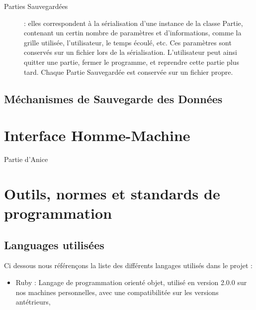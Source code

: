 \documentclass[11pt]{article}
\begin{document}
\begin{description}
    \item [Parties Sauvegardées] : elles correspondent à la sérialisation d'une instance de la classe Partie, contenant un certin nombre de paramètres et d'informations, comme la grille utilisée, l'utilisateur, le temps écoulé, etc. Ces paramètres sont conservés sur un fichier lors de la sérialisation. L'utilisateur peut ainsi quitter une partie, fermer le programme, et reprendre cette partie plus tard. Chaque Partie Sauvegardée est conservée sur un fichier propre.
\end{description}

\subsection{Méchanismes de Sauvegarde des Données}



\newpage %

\section{Interface Homme-Machine}

Partie d'Anice

\newpage

\section{Outils, normes et standards de programmation}

\subsection{Languages utilisées}

Ci dessous nous référençons la liste des différents langages utilisés dans le projet : 

\begin{itemize}
	\item Ruby : Langage de programmation orienté objet, utilisé en version 2.0.0 sur nos machines personnelles, avec une compatibilitée sur les versions antétrieurs,
\end{itemize}
\end{document}
